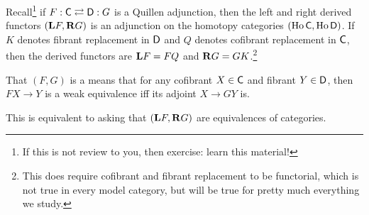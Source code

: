 Recall\footnote{If this is not review to you, then exercise: learn this material!} if $F: \mathsf C\rightleftarrows \mathsf D:
G$ is a Quillen adjunction, then the left and right derived functors $(\mathbf L F, \mathbf R G)$ is an adjunction on the
homotopy categories $(\operatorname{Ho}\mathsf C, \operatorname{Ho}\mathsf D)$. If $K$ denotes fibrant replacement in $\mathsf D$ and
$Q$ denotes cofibrant replacement in $\mathsf C$, then the derived functors are $\mathbf L F = FQ$ and $\mathbf R G =
GK$.\footnote{This does require cofibrant and fibrant replacement to be functorial, which is not true in every
model category, but will be true for pretty much everything we study.}
\begin{defn}
That $(F, G)$ is a  means that for any cofibrant $X\in\mathsf C$ and fibrant $Y\in\mathsf D$, then
$FX\to Y$ is a weak equivalence iff its adjoint $X\to GY$ is.
\end{defn}
This is equivalent to asking that $(\mathbf L F, \mathbf R G)$ are equivalences of categories.

